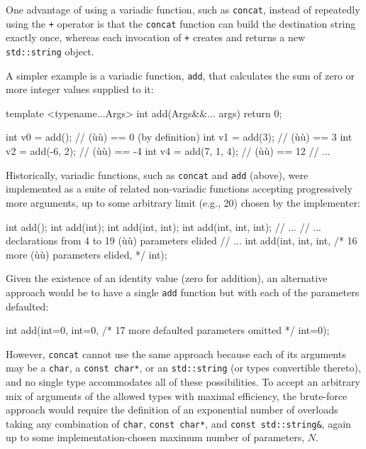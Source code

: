 \noindent One advantage of using a variadic function, such as \lstinline!concat!,
instead of repeatedly using the \lstinline!+! operator is that the
\lstinline!concat! function can build the destination string exactly once,
whereas each invocation of \lstinline!+! creates and returns a new
\lstinline!std::string! object.

A simpler example is a variadic function, \lstinline!add!, that calculates
the sum of zero or more integer values supplied to it:

\begin{emcppshiddenlisting}[emcppsbatch=e2]
template <typename...Args>
int add(Args&&... args) { return 0; }
\end{emcppshiddenlisting}
\begin{emcppslisting}[emcppsbatch=e2]
int v0 = add();         // (ù{}ù) ==  0 (by definition)
int v1 = add(3);        // (ù{}ù) ==  3
int v2 = add(-6, 2);    // (ù{}ù) == -4
int v4 = add(7, 1, 4);  // (ù{}ù) == 12
// ...
\end{emcppslisting}
    

\noindent Historically, variadic functions, such as \lstinline!concat! and
\lstinline!add! (above), were implemented as a suite of related
non-variadic functions accepting progressively more arguments, up to
some arbitrary limit (e.g., 20) chosen by the implementer:

\begin{emcppslisting}
int add();
int add(int);
int add(int, int);
int add(int, int, int);
// ...
// ... declarations from 4 to 19 (ù{}ù) parameters elided
// ...
int add(int, int, int, /* 16 more (ù{}ù) parameters elided, */ int);
\end{emcppslisting}
    

\noindent Given the existence of an identity value (zero for addition), an
alternative approach would be to have a single \lstinline!add! function but
with each of the parameters defaulted:

\begin{emcppslisting}
int add(int=0, int=0, /* 17 more defaulted parameters omitted */ int=0);
\end{emcppslisting}
    

\noindent However, \lstinline!concat! cannot use the same approach because each of
its arguments may be a \lstinline!char!, a \lstinline!const!~\lstinline!char*!,
or an \lstinline!std::string! (or types convertible thereto), and no single
type accommodates all of these possibilities. To accept an arbitrary mix
of arguments of the allowed types with maximal efficiency, the
brute-force approach would require the definition of an exponential
number of overloads taking any combination of \lstinline!char!,
\lstinline!const!~\lstinline!char*!, and
\lstinline!const!~\lstinline!std::string&!, again up to some
implementation-chosen maximum number of parameters, \(N\).

